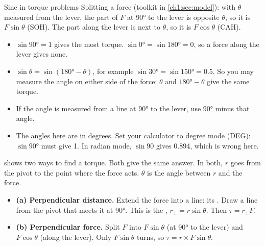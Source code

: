\begin{toolkit}{Sine in torque problems}
Splitting a force (toolkit in \cref{ch1:sec:model}): with $\theta$ measured from the lever, the
part of $F$ at \ang{90} to the lever is opposite $\theta$, so it is $F\sin\theta$ (SOH). The part
along the lever is next to $\theta$, so it is $F\cos\theta$ (CAH).
\begin{itemize}
  \item $\sin\ang{90} = 1$ gives the most torque. $\sin\ang{0} = \sin\ang{180} = 0$, so a force
        along the lever gives none.
  \item $\sin\theta = \sin(\ang{180} - \theta)$, for example $\sin\ang{30} = \sin\ang{150} = 0.5$.
        So you may measure the angle on either side of the force: $\theta$ and
        $\ang{180} - \theta$ give the same torque.
  \item If the angle is measured from a line at \ang{90} to the lever, use \ang{90} minus that angle.
  \item The angles here are in degrees. Set your calculator to degree mode (DEG): $\sin\ang{90}$
        must give 1. In radian mode, $\sin 90$ gives 0.894, which is wrong here.
\end{itemize}
\end{toolkit}

 shows two ways to find a torque. Both give the same answer. In both, $r$
goes from the pivot to the point where the force acts. $\theta$ is the angle between $r$ and
the force.
\begin{itemize}
  \item \textbf{(a) Perpendicular distance.} Extend the force into a line: its . Draw a line from the pivot that meets it at \ang{90}. This is the
        , $r_\perp = r\sin\theta$. Then $\tau = r_\perp F$.
  \item \textbf{(b) Perpendicular force.} Split $F$ into $F\sin\theta$ (at \ang{90} to the lever)
        and $F\cos\theta$ (along the lever). Only $F\sin\theta$ turns, so $\tau = r \times F\sin\theta$.
\end{itemize}

